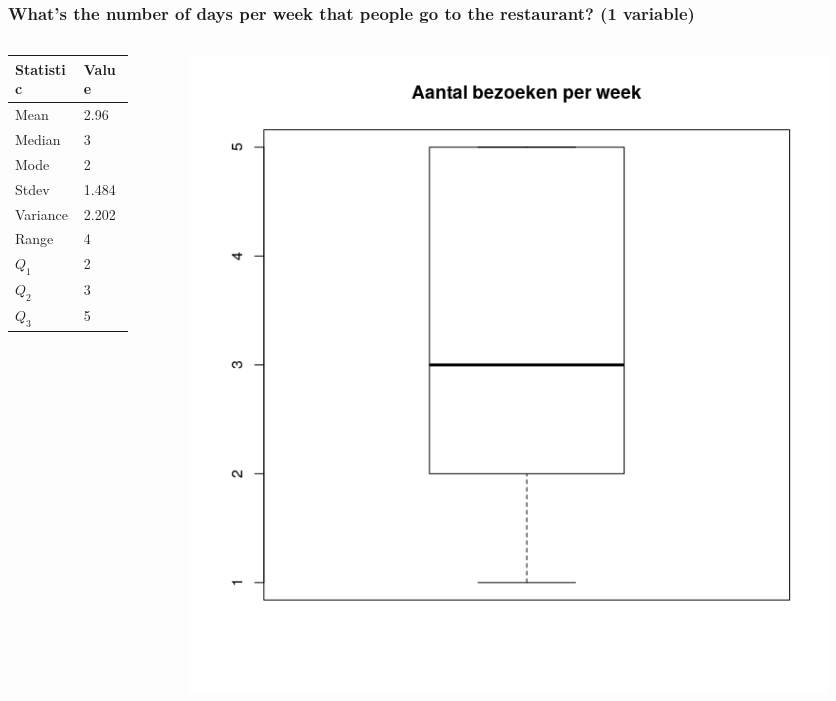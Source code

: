 \documentclass{beamer}
\begin{document}
\begin{frame}
  \frametitle{What's the number of days per week that people go to the restaurant? (1 variable)}
  
  \begin{columns}
    \begin{column}{0.5\textwidth}
      \begin{table}[h]
        \begin{tabular}{|l|l|}
        	\hline
        	{\textbf{Statistic}} & \textbf{Value} \\ \hline
        	Mean                 & 2.96           \\ \hline
        	Median               & 3              \\ \hline
        	Mode                 & 2              \\ \hline
        	Stdev                & 1.484          \\ \hline
        	Variance             & 2.202          \\ \hline
        	Range                & 4              \\ \hline
        	$Q_{1}$              & 2              \\ \hline
        	$Q_{2}$              & 3              \\ \hline
        	$Q_{3}$              & 5              \\ \hline
        \end{tabular}
      \end{table}
    \end{column}
    \begin{column}{0.5\textwidth}

      \begin{figure}
        \centering
        \includegraphics[width=1.00\textwidth]{img/2var-boxplot-aantalbezoeken}
      \end{figure}


\end{column}
\end{columns}
\end{frame}
\end{document}
